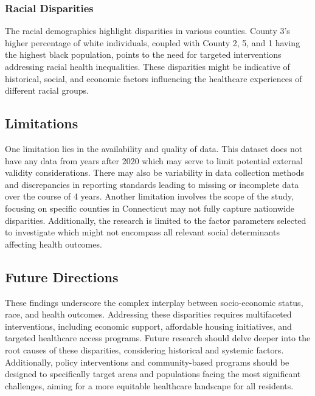 \documentclass[12pt]{article}
\begin{document}
\subsubsection{Racial Disparities}
The racial demographics highlight disparities in various counties. County 3's higher percentage of white 
individuals, coupled with County 2, 5, and 1 having the highest black population, points to the need for
targeted interventions addressing racial health inequalities. These disparities might be indicative of 
historical, social, and economic factors influencing the healthcare experiences of different racial groups.

\subsection{Limitations}
One limitation lies in the availability and quality of data. This dataset does not have any 
data from years after 2020 which may serve to limit potential external validity considerations. 
There may also be variability in data collection methods and discrepancies in reporting standards 
leading to missing or incomplete data over the course of 4 years. Another limitation involves the scope 
of the study, focusing on specific counties in Connecticut may not fully capture nationwide disparities. 
Additionally, the research is limited to the factor parameters selected to investigate which  might not 
encompass all relevant social determinants affecting health outcomes.

\subsection{Future Directions}
These findings underscore the complex interplay between socio-economic status, race, and health outcomes. 
Addressing these disparities requires multifaceted interventions, including economic support, affordable 
housing initiatives, and targeted healthcare access programs. Future research should delve deeper into the 
root causes of these disparities, considering historical and systemic factors. Additionally, policy interventions 
and community-based programs should be designed to specifically target areas and populations facing the most 
significant challenges, aiming for a more equitable healthcare landscape for all residents.


\appendix



\end{document}
